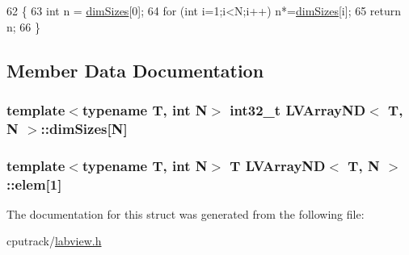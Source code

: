 \begin{DoxyCode}
62                   \{ 
63         \textcolor{keywordtype}{int} n = \hyperlink{struct_l_v_array_n_d_a02efbdecea8a08cdb05b8e6e6c0859db}{dimSizes}[0];
64         \textcolor{keywordflow}{for} (\textcolor{keywordtype}{int} i=1;i<N;i++) n*=\hyperlink{struct_l_v_array_n_d_a02efbdecea8a08cdb05b8e6e6c0859db}{dimSizes}[i];
65         \textcolor{keywordflow}{return} n; 
66     \}
\end{DoxyCode}


\subsection{Member Data Documentation}
\subsubsection[{\texorpdfstring{dim\+Sizes}{dimSizes}}]{\setlength{\rightskip}{0pt plus 5cm}template$<$typename T, int N$>$ int32\+\_\+t {\bf L\+V\+Array\+ND}$<$ T, N $>$\+::dim\+Sizes\mbox{[}N\mbox{]}}\hypertarget{struct_l_v_array_n_d_a02efbdecea8a08cdb05b8e6e6c0859db}{}\label{struct_l_v_array_n_d_a02efbdecea8a08cdb05b8e6e6c0859db}
\subsubsection[{\texorpdfstring{elem}{elem}}]{\setlength{\rightskip}{0pt plus 5cm}template$<$typename T, int N$>$ T {\bf L\+V\+Array\+ND}$<$ T, N $>$\+::elem\mbox{[}1\mbox{]}}\hypertarget{struct_l_v_array_n_d_ae7304410dde557a741391927fbbfeed1}{}\label{struct_l_v_array_n_d_ae7304410dde557a741391927fbbfeed1}


The documentation for this struct was generated from the following file\+:\begin{DoxyCompactItemize}
\item 
cputrack/\hyperlink{labview_8h}{labview.\+h}\end{DoxyCompactItemize}

